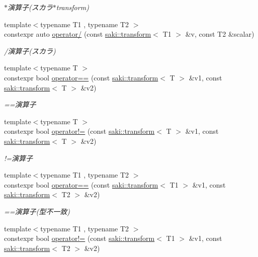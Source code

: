 \begin{DoxyCompactItemize}
\begin{DoxyCompactList}\small\item\em $\ast$演算子(スカラ$\ast$transform) \end{DoxyCompactList}\item 
{\footnotesize template$<$typename T1 , typename T2 $>$ }\\constexpr auto \mbox{\hyperlink{namespacesaki_aae41cae2f869873e083124ad5f1b5f67}{operator/}} (const \mbox{\hyperlink{classsaki_1_1transform}{saki\+::transform}}$<$ T1 $>$ \&v, const T2 \&scalar)
\begin{DoxyCompactList}\small\item\em /演算子(スカラ) \end{DoxyCompactList}\item 
{\footnotesize template$<$typename T $>$ }\\constexpr bool \mbox{\hyperlink{namespacesaki_a57a23952c9becf92a51ff1742f645d66}{operator==}} (const \mbox{\hyperlink{classsaki_1_1transform}{saki\+::transform}}$<$ T $>$ \&v1, const \mbox{\hyperlink{classsaki_1_1transform}{saki\+::transform}}$<$ T $>$ \&v2)
\begin{DoxyCompactList}\small\item\em ==演算子 \end{DoxyCompactList}\item 
{\footnotesize template$<$typename T $>$ }\\constexpr bool \mbox{\hyperlink{namespacesaki_af91b2b2e47f5556c7604281af5223247}{operator!=}} (const \mbox{\hyperlink{classsaki_1_1transform}{saki\+::transform}}$<$ T $>$ \&v1, const \mbox{\hyperlink{classsaki_1_1transform}{saki\+::transform}}$<$ T $>$ \&v2)
\begin{DoxyCompactList}\small\item\em !=演算子 \end{DoxyCompactList}\item 
{\footnotesize template$<$typename T1 , typename T2 $>$ }\\constexpr bool \mbox{\hyperlink{namespacesaki_afde7d962261485c2054cd1a98ed337ed}{operator==}} (const \mbox{\hyperlink{classsaki_1_1transform}{saki\+::transform}}$<$ T1 $>$ \&v1, const \mbox{\hyperlink{classsaki_1_1transform}{saki\+::transform}}$<$ T2 $>$ \&v2)
\begin{DoxyCompactList}\small\item\em ==演算子(型不一致) \end{DoxyCompactList}\item 
{\footnotesize template$<$typename T1 , typename T2 $>$ }\\constexpr bool \mbox{\hyperlink{namespacesaki_a8c33f5cbcafab48779b77c324716fed9}{operator!=}} (const \mbox{\hyperlink{classsaki_1_1transform}{saki\+::transform}}$<$ T1 $>$ \&v1, const \mbox{\hyperlink{classsaki_1_1transform}{saki\+::transform}}$<$ T2 $>$ \&v2)

\end{DoxyCompactItemize}
